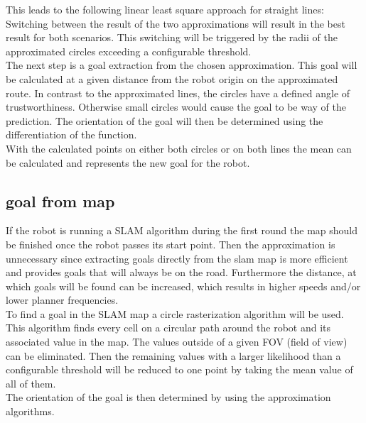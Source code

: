 This leads to the following linear least square approach for straight lines:\\

Switching between the result of the two approximations will result in the best result for both scenarios. This switching will be triggered by the radii of the approximated circles exceeding a configurable threshold.\\

The next step is a goal extraction from the chosen approximation. This goal will be calculated at a given distance from the robot origin on the approximated route. In contrast to the approximated lines, the circles have a defined angle of trustworthiness. Otherwise small circles would cause the goal to be way of the prediction. The orientation of the goal will then be determined using the differentiation of the function.\\

With the calculated points on either both circles or on both lines the mean can be calculated and represents the new goal for the robot.



\subsection{goal from map}

If the robot is running a SLAM algorithm during the first round the map should be finished once the robot passes its start point. Then the approximation is unnecessary since extracting goals directly from the slam map is more efficient and provides goals that will  always be on the road. Furthermore the distance, at which goals will be found can be increased, which results in higher speeds and/or lower planner frequencies.\\

To find a goal in the SLAM map a circle rasterization algorithm will be used.\\

This algorithm finds every cell on a circular path around the robot and its associated value in the map. The values outside of a given FOV (field of view) can be eliminated. Then the remaining values with a larger likelihood than a configurable threshold will be reduced to one point by taking the mean value of all of them.\\

The orientation of the goal is then determined by using the approximation algorithms.


